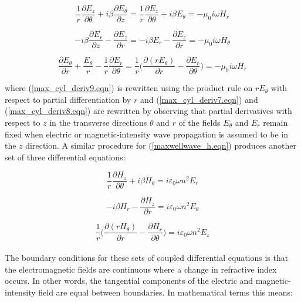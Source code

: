 \documentclass[12pt]{article}
\theoremstyle{definition}
\numberwithin{equation}{section}
\begin{document}
\begin{equation}
\frac{1}{r}\frac{\partial E_z}{\partial\theta}+i\beta\frac{\partial E_{\theta}}{\partial z}=\frac{1}{r}\frac{\partial E_z}{\partial\theta}+i\beta E_{\theta}=-\mu_{0} i\omega H_r 
\label{max_cyl_deriv7.eqn}
\end{equation}

\begin{equation}
-i\beta\frac{\partial E_r}{\partial z}-\frac{\partial E_z}{\partial r}=-i\beta E_r -\frac{\partial E_z}{\partial r}=-\mu_{0} i\omega H_{\theta}
\label{max_cyl_deriv8.eqn}
\end{equation}

\begin{equation}
\frac{\partial E_{\theta}}{\partial r}+\frac{E_{\theta}}{r}-\frac{1}{r}\frac{\partial E_r}{\partial\theta}= \frac{1}{r}\bigg(\frac{\partial (rE_{\theta})}{\partial r} -\frac{\partial E_r}{\partial\theta}\bigg)=-\mu_{0} i\omega H_r 
\label{max_cyl_deriv9.eqn}
\end{equation}

where (\ref{max_cyl_deriv9.eqn}) is rewritten using the product rule on $rE_{\theta}$ with respect to partial differentiation by $r$ and (\ref{max_cyl_deriv7.eqn}) and (\ref{max_cyl_deriv8.eqn}) are rewritten by observing that partial derivatives with respect to $z$ in the transverse directions $\theta$ and $r$ of the fields $E_{\theta}$ and $E_r$ remain fixed when electric or magnetic-intensity wave propagation is assumed to be in the $z$ direction. A similar procedure for (\ref{maxwellwave_h.eqn}) produces another set of three differential equations:

\begin{equation}
\frac{1}{r}\frac{\partial H_z}{\partial\theta}+i\beta H_{\theta}=i\varepsilon_{0}\omega n^2 E_r 
\label{max_cyl_deriv10.eqn}
\end{equation}

\begin{equation}
-i\beta H_r -\frac{\partial H_z}{\partial r}=i\varepsilon_{0}\omega n^2 E_{\theta} 
\label{max_cyl_deriv11.eqn}
\end{equation}

\begin{equation}
\frac{1}{r}\bigg(\frac{\partial (rH_{\theta})}{\partial r} -\frac{\partial H_r}{\partial\theta}\bigg)=i\varepsilon_{0}\omega n^2 E_z 
\label{max_cyl_deriv12.eqn}
\end{equation}\\

The boundary conditions for these sets of coupled differential equations is that the electromagnetic fields are continuous where a change in refractive index occurs. In other words, the tangential components of the electric and magnetic-intensity field are equal between boundaries. In mathematical terms this means:
\end{document}
